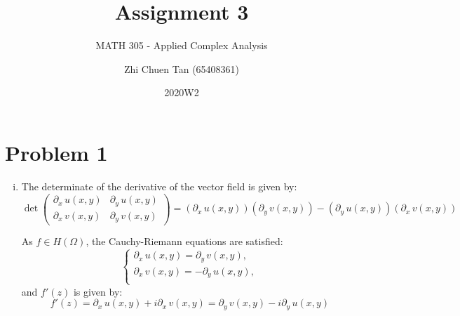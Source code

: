 \documentclass[a4paper, titlepage, DIV=14]{scrartcl}
\title{Assignment 3}
\subtitle{MATH 305 - Applied Complex Analysis}
\author{Zhi Chuen Tan (65408361)}
\date{2020W2}
\begin{document}
    \onehalfspacing
    \hypersetup{pageanchor=false}
    \begin{titlepage}
        \maketitle
        \vfill
        
    \end{titlepage}
    \hypersetup{pageanchor=true}

    \section*{Problem 1}
    \begin{enumerate}[(i)]
        \item 
        The determinate of the derivative of the vector field is given by:
        \begin{equation*}
            \det 
            \begin{pmatrix}
                \partial_{x} \, u(x,y) & \partial_{y} \, u(x,y) \\
                \partial_{x} \, v(x,y) & \partial_{y} \, v(x,y)
            \end{pmatrix} 
            = (\partial_{x} \, u(x,y))(\partial_{y} \, v(x,y)) - (\partial_{y} \, u(x,y))(\partial_{x} \, v(x,y))
        \end{equation*}
        
        As $f\in H(\Omega)$, the Cauchy-Riemann equations are satisfied:
        \[
          \begin{cases}
            \partial_{x} \, u(x,y) = \partial_{y} \, v(x,y), \\
            \partial_{x} \, v(x,y) = -\partial_{y} \, u(x,y), \\
          \end{cases}  
        \]
        and $f'(z)$ is given by:
        \begin{equation*}
            f'(z) = \partial_{x} \, u(x,y) + i\partial_{x} \, v(x,y) = \partial_{y} \, v(x,y) - i\partial_{y} \, u(x,y)
        \end{equation*}


\end{enumerate}
\end{document}
